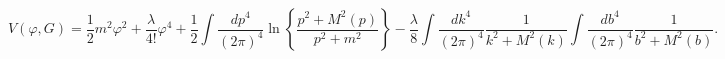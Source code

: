 \begin{equation}
V(\varphi,G)=\frac{1}{2}m^{2}\varphi^{2}+\frac{\lambda}{4!}\varphi^{4}%
+\frac{1}{2}\int \frac{dp^{4}}{(2\pi)^{4}}\ln\left\{
\frac{p^{2}+M^{2}(p)}{p^{2}+m^{2}}\right\} -\frac{\lambda}{8}\int
\frac{dk^{4}}{(2\pi)^{4}}\frac{1}{k^{2}+M^{2}(k)}\int
\frac{db^{4}}{(2\pi)^{4}}\frac{1}
{b^{2}+M^{2}(b)}. \label{vcom}%
\end{equation}

